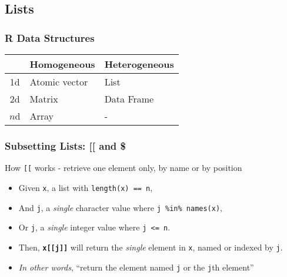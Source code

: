 \documentclass{beamer}
\newcommand{\R}[1]{\texttt{#1}}
\begin{document}

\subsection{Lists}
\begin{frame}
\frametitle{R Data Structures}

\begin{table}
\begin{tabular}{c|ll}
   &  Homogeneous   & Heterogeneous \\ \hline
1d & Atomic vector &  \cellcolor{gray!25} List \\
2d & Matrix        & Data Frame \\
$n$d & Array       & - \\ 
\end{tabular}
\end{table}

\end{frame}

\begin{frame}[fragile]
\frametitle{Subsetting Lists: [[ and \$}

How \R{[[} works - retrieve one element only, by name or by position
\begin{itemize}
\item Given \R{x}, a list with \R{length(x) == n},
\item And \R{j}, a \textit{single} character value where \R{j \%in\% names(x)},
\item Or \R{j}, a \textit{single} integer value where \R{j <= n}.
\item Then, \R{\textbf{x[[j]]}} will return the \textit{single} element in \R{x}, named or indexed by \R{j}.
\item \textit{In other words}, ``return the element named \R{j} or the \R{j}th element''
\end{itemize}

\end{frame}
\end{document}
